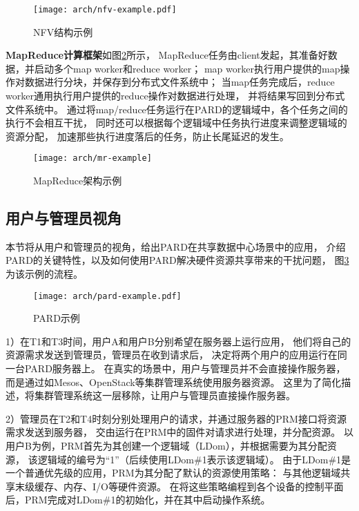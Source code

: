\begin{figure}[htb]
  \centering
  \texttt{[image: arch/nfv-example.pdf]}
  \caption{NFV结构示例\cite{etsi_nfv_2014}}
  \label{fig:nfv-example}
\end{figure}


\textbf{MapReduce计算框架}如图\ref{fig:mr-example}所示，
MapReduce任务由client发起，其准备好数据，并启动多个map worker和reduce worker；
map worker执行用户提供的map操作对数据进行分块，并保存到分布式文件系统中；
当map任务完成后，reduce worker通用执行用户提供的reduce操作对数据进行处理，
并将结果写回到分布式文件系统中。
通过将map/reduce任务运行在PARD的逻辑域中，各个任务之间的执行不会相互干扰，
同时还可以根据每个逻辑域中任务执行进度来调整逻辑域的资源分配，
加速那些执行进度落后的任务，防止长尾延迟的发生。

\begin{figure}[htb]
  \centering
  \texttt{[image: arch/mr-example]}
  \caption{MapReduce架构示例}
  \label{fig:mr-example}
\end{figure}


\subsection{用户与管理员视角}

本节将从用户和管理员的视角，给出PARD在共享数据中心场景中的应用，
介绍PARD的关键特性，以及如何使用PARD解决硬件资源共享带来的干扰问题，
图\ref{fig:pard-example}为该示例的流程。

\begin{figure}[b]
  \centering
  \texttt{[image: arch/pard-example.pdf]}
  \caption{PARD示例}
  \label{fig:pard-example}
\end{figure}

1）在T1和T3时间，用户A和用户B分别希望在服务器上运行应用，
他们将自己的资源需求发送到管理员，管理员在收到请求后，
决定将两个用户的应用运行在同一台PARD服务器上。
在真实的场景中，用户与管理员并不会直接操作服务器，
而是通过如Mesos\cite{Hindman:2011:Mesos}、OpenStack\cite{OpenStack}等集群管理系统使用服务器资源。
这里为了简化描述，将集群管理系统这一层移除，让用户与管理员直接操作服务器。

2）管理员在T2和T4时刻分别处理用户的请求，并通过服务器的PRM接口将资源需求发送到服务器，
交由运行在PRM中的固件对请求进行处理，并分配资源。
以用户B为例，PRM首先为其创建一个逻辑域（LDom），并根据需要为其分配资源，
该逻辑域的编号为``1''（后续使用LDom\#1表示该逻辑域）。
由于LDom\#1是一个普通优先级的应用，PRM为其分配了默认的资源使用策略：
与其他逻辑域共享末级缓存、内存、I/O等硬件资源。
在将这些策略编程到各个设备的控制平面后，PRM完成对LDom\#1的初始化，并在其中启动操作系统。


